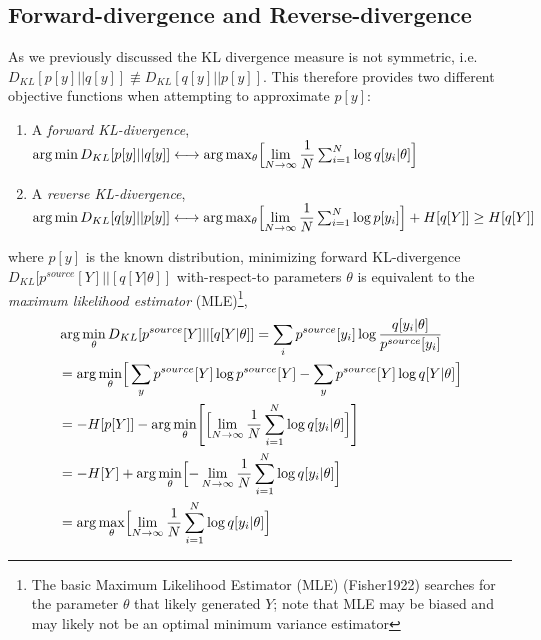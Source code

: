 \documentclass[7pt]{article}
\begin{document}
\subsection{Forward-divergence and Reverse-divergence}

As we previously discussed the KL divergence measure is not symmetric, i.e. $D_{KL} [p[y]||q[y]] \not\equiv D_{KL} [q[y]||p[y]]$. This therefore provides two different objective functions when attempting to approximate $p[y]$:
\begin{enumerate}
	\item A \emph{forward KL-divergence}, $\arg \min D_{KL} [p[y]||q[y]] \longleftrightarrow \arg \max_{\theta} \Bigl[ \lim\limits_{ N \rightarrow \infty } \dfrac{1}{N} \sum^N_{i=1} \log q[y_i|\theta]\Bigr]  $
	\item A \emph{reverse KL-divergence}, $\arg \min D_{KL} [q[y]||p[y]] \longleftrightarrow  \arg \max_{\theta} \Bigl[ \lim\limits_{ N \rightarrow \infty } \dfrac{1}{N} \sum^N_{i=1} \log p[y_i]\Bigr]  + H[q[Y]] \geq H[q[Y]]\\
	$
\end{enumerate}
where $p[y]$ is the known distribution, minimizing forward KL-divergence $D_{KL} [p^{source}[Y]||[q[Y|\theta]]$ with-respect-to parameters $\theta$ is equivalent to the \emph{maximum likelihood estimator} (MLE)\footnote{The basic Maximum Likelihood Estimator (MLE) (Fisher1922) searches for the parameter $\theta$ that likely generated $Y$; note that MLE may be biased and may likely not be an optimal minimum variance estimator},
\begin{equation}
\begin{split}
& \arg \min_{\theta} D_{KL} [p^{source}[Y]||[q[Y|\theta]] = \sum_{i} p^{source}[y_i] \log \dfrac{q[y_i|\theta]}{p^{source}[y_i]}  \\
& =  \arg \min_{\theta} \Bigr[  \sum_{y} p^{source}[Y] \log {p^{source}[Y] }   - \sum_{y} p^{source}[Y] \log {q[Y|\theta]} \Bigr]\\
& =  -H[p[Y]] - \arg \min_{\theta} \Biggr[  \Bigl[ \lim\limits_{ N \rightarrow \infty } \dfrac{1}{N} \sum^N_{i=1} \log q[y_i|\theta]\Bigr] \Biggr]  \\
&  = -H[Y] + \arg \min_{\theta} \Bigl[ - \lim\limits_{ N \rightarrow \infty } \dfrac{1}{N} \sum^N_{i=1} \log q[y_i|\theta]\Bigr]  \\
&  =  \arg \max_{\theta} \Bigl[ \lim\limits_{ N \rightarrow \infty } \dfrac{1}{N} \sum^N_{i=1} \log q[y_i|\theta]\Bigr]  \\
\end{split}
\end{equation}
\end{document}

